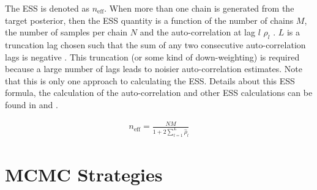 \documentclass[12pt, a4paper]{article}
\begin{document}
            The ESS is denoted as $n_{\text{eff}}$. When more than one chain is generated from the target posterior, then the ESS quantity is a function of the number of chains $M$, the number of samples per chain $N$ and the auto-correlation at lag $l$ $\rho_l$ \citep{vehtari2021rank}. $L$ is a truncation lag chosen such that the sum of any two consecutive auto-correlation lags is negative \citep{geyer1992practical}. This truncation (or some kind of down-weighting) is required because a large number of lags leads to noisier auto-correlation estimates. Note that this is only one approach to calculating the ESS. Details about this ESS formula, the calculation of the auto-correlation and other ESS calculations can be found in \citet{vehtari2021rank} and \citet{geyer1992practical}.

            $$
            \begin{aligned}
                n_{\text{eff}} = \frac{NM}{1+2 \sum_{l=1}^L \hat{\rho}_l}
            \end{aligned}
            $$

\section{MCMC Strategies}
\end{document}
